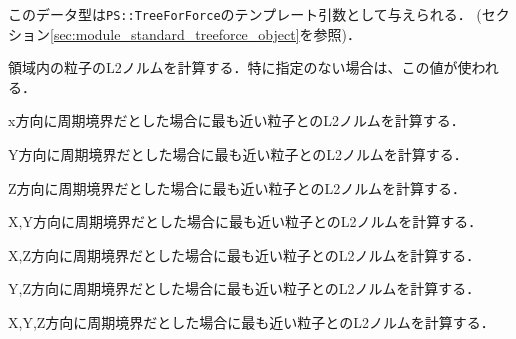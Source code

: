 このデータ型は{\tt PS::TreeForForce}のテンプレート引数として与えられる．
(セクション\ref{sec:module_standard_treeforce_object}を参照)．


領域内の粒子のL2ノルムを計算する．特に指定のない場合は、この値が使われる．


x方向に周期境界だとした場合に最も近い粒子とのL2ノルムを計算する．


Y方向に周期境界だとした場合に最も近い粒子とのL2ノルムを計算する．


Z方向に周期境界だとした場合に最も近い粒子とのL2ノルムを計算する．


X,Y方向に周期境界だとした場合に最も近い粒子とのL2ノルムを計算する．


X,Z方向に周期境界だとした場合に最も近い粒子とのL2ノルムを計算する．


Y,Z方向に周期境界だとした場合に最も近い粒子とのL2ノルムを計算する．


X,Y,Z方向に周期境界だとした場合に最も近い粒子とのL2ノルムを計算する．
